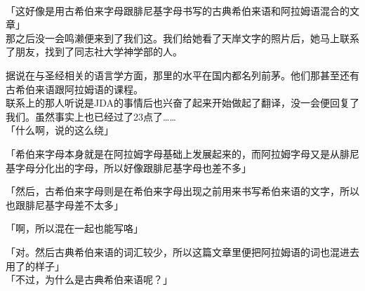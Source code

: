 \sqsplit\\

「这好像是用古希伯来字母跟腓尼基字母书写的古典希伯来语和阿拉姆语混合的文章」\\

那之后没一会鸣濑便来到了我们这。我们给她看了天岸文字的照片后，她马上联系了朋友，找到了同志社大学神学部的人。

据说在与圣经相关的语言学方面，那里的水平在国内都名列前茅。他们那甚至还有古希伯来语跟阿拉姆语的课程。\\

联系上的那人听说是JDA的事情后也兴奋了起来开始做起了翻译，没一会便回复了我们。虽然事实上也已经过了23点了……\\

「什么啊，说的这么绕」

「希伯来字母本身就是在阿拉姆字母基础上发展起来的，而阿拉姆字母又是从腓尼基字母分化出的字母，所以好像跟腓尼基字母也差不多」

「然后，古希伯来字母则是在希伯来字母出现之前用来书写希伯来语的文字，所以也跟腓尼基字母差不太多」

「啊，所以混在一起也能写咯」

「对。然后古典希伯来语的词汇较少，所以这篇文章里便把阿拉姆语的词也混进去用了的样子」\\

「不过，为什么是古典希伯来语呢？」

